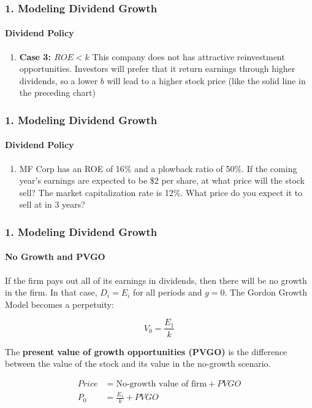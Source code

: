\documentclass{beamer}
\begin{document}
\begin{frame}[t]
\frametitle{1. Modeling Dividend Growth}
\framesubtitle{Dividend Policy}

    \begin{enumerate}
        
        \item[3.] \textbf{Case 3: $ROE < k$} This company does not has attractive reinvestment 
        opportunities.   Investors will prefer that it return earnings through higher dividends, so a lower $b$ will lead to a higher stock price (like the solid line in the preceding chart)
    \end{enumerate}

\end{frame}

\begin{practiceframe}[t]
\frametitle{1. Modeling Dividend Growth}
\framesubtitle{Dividend Policy}

    {\footnotesize
    \begin{enumerate}
        \item MF Corp has an ROE of 16\% and a plowback ratio of 50\%.   If the coming 
        year's earnings are expected to be \$2 per share, at what price will the stock 
        sell? The market capitalization rate is 12\%.   What price do you expect it 
        to sell at in 3 years?

    \end{enumerate}
    }

\end{practiceframe}

\begin{frame}[t]
    \frametitle{1. Modeling Dividend Growth}
    \framesubtitle{No Growth and PVGO}

    If the firm pays out all of its earnings in dividends, then there will be no growth in the firm.   In that case, $D_i = E_i$ for all periods and $g=0$.  The Gordon Growth Model becomes a perpetuity:

    $$V_0 = \frac{E_1}{k}$$

    The \textbf{present value of growth opportunities (PVGO)}
    is the difference between the value of the stock and its value in the no-growth scenario. 

    \begin{align*}
        Price &= \text{No-growth value of firm} + PVGO\\
        P_0 &= \frac{E_1}{k} + PVGO
    \end{align*}

\end{frame}
\end{document}
